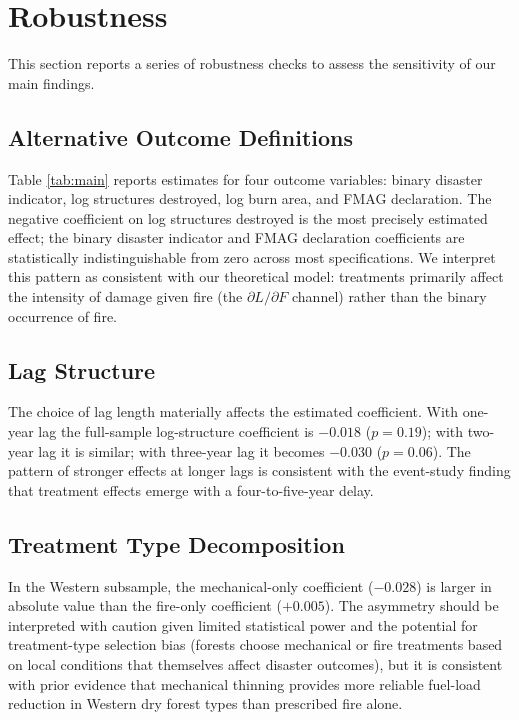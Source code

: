 \documentclass[12pt, letterpaper]{article}
\begin{document}
\section{Robustness}\label{sec:robust}

This section reports a series of robustness checks to assess the sensitivity of our main findings.

\subsection{Alternative Outcome Definitions}

Table \ref{tab:main} reports estimates for four outcome variables: binary disaster indicator, log structures destroyed, log burn area, and FMAG declaration. The negative coefficient on log structures destroyed is the most precisely estimated effect; the binary disaster indicator and FMAG declaration coefficients are statistically indistinguishable from zero across most specifications. We interpret this pattern as consistent with our theoretical model: treatments primarily affect the intensity of damage given fire (the $\partial L/\partial F$ channel) rather than the binary occurrence of fire.

\subsection{Lag Structure}

The choice of lag length materially affects the estimated coefficient. With one-year lag the full-sample log-structure coefficient is $-0.018$ ($p = 0.19$); with two-year lag it is similar; with three-year lag it becomes $-0.030$ ($p = 0.06$). The pattern of stronger effects at longer lags is consistent with the event-study finding that treatment effects emerge with a four-to-five-year delay.

\subsection{Treatment Type Decomposition}

In the Western subsample, the mechanical-only coefficient ($-0.028$) is larger in absolute value than the fire-only coefficient ($+0.005$). The asymmetry should be interpreted with caution given limited statistical power and the potential for treatment-type selection bias (forests choose mechanical or fire treatments based on local conditions that themselves affect disaster outcomes), but it is consistent with prior evidence that mechanical thinning provides more reliable fuel-load reduction in Western dry forest types than prescribed fire alone.
\end{document}
